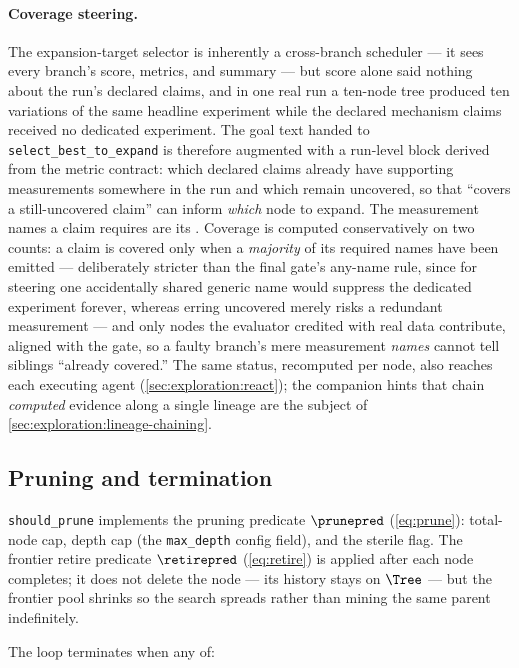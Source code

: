 \paragraph{Coverage steering.}
The expansion-target selector is inherently a cross-branch scheduler
--- it sees every branch's score, metrics, and summary --- but score
alone said nothing about the run's declared claims, and in one real
run a ten-node tree produced ten variations of the same headline
experiment while the declared mechanism claims received no dedicated
experiment. The goal text handed to \texttt{select\_best\_to\_expand}
is therefore augmented with a run-level  block
derived from the metric contract: which declared claims already have
supporting measurements somewhere in the run and which remain
uncovered, so that ``covers a still-uncovered claim'' can inform
\emph{which} node to expand. The measurement names a claim requires
are its . Coverage is computed
conservatively on two counts: a claim is covered only when a
\emph{majority} of its required names have been emitted ---
deliberately stricter than the final gate's any-name rule, since for
steering one accidentally shared generic name would suppress the
dedicated experiment forever, whereas erring uncovered merely risks a
redundant measurement --- and only nodes the evaluator credited with
real data contribute, aligned with the gate, so a faulty branch's
mere measurement \emph{names} cannot tell siblings ``already
covered.'' The same status, recomputed per node, also reaches each
executing agent (\cref{sec:exploration:react}); the companion hints
that chain \emph{computed} evidence along a single lineage are the
subject of \cref{sec:exploration:lineage-chaining}.

\subsection{Pruning and termination}\label{sec:exploration:termination}

\texttt{should\_prune} implements the pruning predicate $\prunepred$
(\cref{eq:prune}): total-node cap, depth cap (the \texttt{max\_depth}
config field), and the sterile flag. The frontier retire predicate
$\retirepred$ (\cref{eq:retire}) is applied after each node
completes; it does not delete the node — its history stays on $\Tree$
— but the frontier pool shrinks so the search spreads rather than
mining the same parent indefinitely.

The loop terminates when any of:

